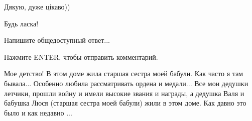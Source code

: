 \begin{itemize}
\begin{itemize}
\end{itemize} %

Дякую, дуже цікаво))

Будь ласка!

Напишите общедоступный ответ...

Нажмите ENTER, чтобы отправить комментарий.

Мое детство! В этом доме жила старшая сестра моей бабули. Как часто я там
бывала... Особенно любила рассматривать ордена и медали... Все мои дедушки
летчики, прошли войну и имели высокие звания и награды, а дедушка Валя и
бабушка Люся (старшая сестра моей бабули) жили в этом доме. Как давно это было
и как недавно ...

\end{itemize} %
